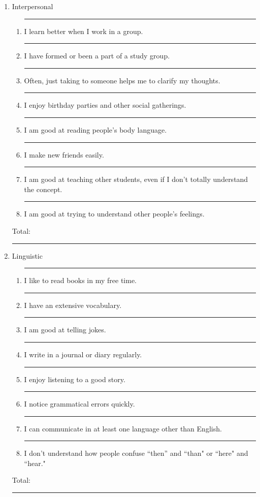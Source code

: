 \documentclass[letterpaper, 10pt]{article}
\begin{document}
\begin{enumerate}
\item Interpersonal
	\begin{enumerate}
	\item \rule{.5in}{.01in} I learn better when I work in a group.
	\item \rule{.5in}{.01in} I have formed or been a part of a study group.
	\item \rule{.5in}{.01in} Often, just taking to someone helps me to clarify my thoughts.
	\item \rule{.5in}{.01in} I enjoy birthday parties and other social gatherings.
	\item \rule{.5in}{.01in} I am good at reading people's body language.
	\item \rule{.5in}{.01in} I make new friends easily.
	\item \rule{.5in}{.01in} I am good at teaching other students, even if I don't totally understand the concept.
	\item \rule{.5in}{.01in} I am good at trying to understand other people's feelings.
\end{enumerate}
Total:  \rule{.5in}{.01in}


\item Linguistic
	\begin{enumerate}
	\item \rule{.5in}{.01in} I like to read books in my free time.
	\item \rule{.5in}{.01in} I have an extensive vocabulary.
	\item \rule{.5in}{.01in} I am good at telling jokes.
	\item \rule{.5in}{.01in} I write in a journal or diary regularly. 
	\item \rule{.5in}{.01in} I enjoy listening to a good story.
	\item \rule{.5in}{.01in} I notice grammatical errors quickly.  
	\item \rule{.5in}{.01in} I can communicate in at least one language other than English.
	\item \rule{.5in}{.01in} I don't understand how people confuse ``then'' and ``than" or ``here" and ``hear."
	
\end{enumerate}
Total:  \rule{.5in}{.01in}


\end{enumerate}
\end{document}
